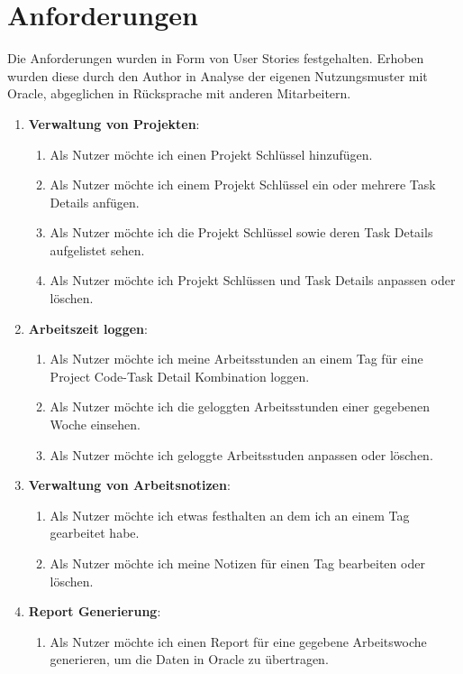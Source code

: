 \documentclass[oneside,bibliography=totocnumbered,BCOR=5mm]{scrbook}
\begin{document}
\section{Anforderungen}

Die Anforderungen wurden in Form von User Stories festgehalten. Erhoben wurden
diese durch den Author in Analyse der eigenen Nutzungsmuster mit Oracle,
abgeglichen in Rücksprache mit anderen Mitarbeitern.

\begin{enumerate}
  \item \textbf{Verwaltung von Projekten}:
    \begin{enumerate}
      \item Als Nutzer möchte ich einen Projekt Schlüssel hinzufügen.
      \item Als Nutzer möchte ich einem Projekt Schlüssel ein oder mehrere Task Details anfügen.
      \item Als Nutzer möchte ich die Projekt Schlüssel sowie deren Task Details aufgelistet sehen.
      \item Als Nutzer möchte ich Projekt Schlüssen und Task Details anpassen oder löschen.
    \end{enumerate}
  \item \textbf{Arbeitszeit loggen}:
    \begin{enumerate}
      \item Als Nutzer möchte ich meine Arbeitsstunden an einem Tag für eine Project Code-Task Detail Kombination loggen.
      \item Als Nutzer möchte ich die geloggten Arbeitsstunden einer gegebenen Woche einsehen.
      \item Als Nutzer möchte ich geloggte Arbeitsstuden anpassen oder löschen.
    \end{enumerate}
  \item \textbf{Verwaltung von Arbeitsnotizen}:
    \begin{enumerate}
      \item Als Nutzer möchte ich etwas festhalten an dem ich an einem Tag gearbeitet habe.
      \item Als Nutzer möchte ich meine Notizen für einen Tag bearbeiten oder löschen.
    \end{enumerate}
  \item \textbf{Report Generierung}:
    \begin{enumerate}
      \item Als Nutzer möchte ich einen Report für eine gegebene Arbeitswoche generieren, um die Daten in Oracle zu übertragen.
    \end{enumerate}
\end{enumerate}
\end{document}
